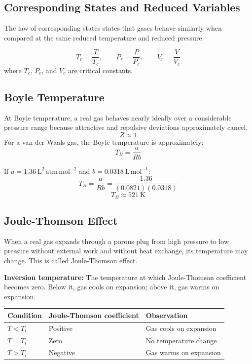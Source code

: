 \documentclass[12pt,a4paper]{article}
\begin{document}
\subsection{Corresponding States and Reduced Variables}
The law of corresponding states states that gases behave similarly when compared at the same reduced temperature and reduced pressure.

\begin{tcolorbox}[formulabox, title={Reduced Variables}]
\[
T_r=\frac{T}{T_c},\qquad P_r=\frac{P}{P_c},\qquad V_r=\frac{V}{V_c}
\]
where $T_c$, $P_c$, and $V_c$ are critical constants.
\end{tcolorbox}

\subsection{Boyle Temperature}
At Boyle temperature, a real gas behaves nearly ideally over a considerable pressure range because attractive and repulsive deviations approximately cancel.
\[
Z\approx1
\]
For a van der Waals gas, the Boyle temperature is approximately:
\[
T_B=\frac{a}{Rb}
\]

\begin{tcolorbox}[examplebox, title={Solved Example: Boyle Temperature}]
If $a=1.36\ \mathrm{L^2\,atm\,mol^{-2}}$ and $b=0.0318\ \mathrm{L\,mol^{-1}}$:
\[
T_B=\frac{a}{Rb}=\frac{1.36}{(0.0821)(0.0318)}
\]
\[
T_B\approx521\ \mathrm{K}
\]
\end{tcolorbox}

\subsection{Joule-Thomson Effect}
When a real gas expands through a porous plug from high pressure to low pressure without external work and without heat exchange, its temperature may change. This is called Joule-Thomson effect.

\begin{tcolorbox}[defbox]
\textbf{Inversion temperature:} The temperature at which Joule-Thomson coefficient becomes zero. Below it, gas cools on expansion; above it, gas warms on expansion.
\end{tcolorbox}

\begin{tabularx}{\linewidth}{|B{3.0cm}|Y|Y|}
\hline
\textbf{Condition} & \textbf{Joule-Thomson coefficient} & \textbf{Observation} \\
\hline
$T<T_i$ & Positive & Gas cools on expansion \\
\hline
$T=T_i$ & Zero & No temperature change \\
\hline
$T>T_i$ & Negative & Gas warms on expansion \\
\hline
\end{tabularx}
\end{document}

